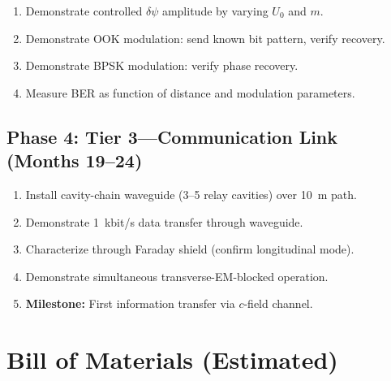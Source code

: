\documentclass[11pt,letterpaper]{article}
\newcommand{\psifield}{\psi}
\begin{document}
\begin{enumerate}
\item Demonstrate controlled $\delta\psifield$ amplitude by
varying $U_0$ and $m$.
\item Demonstrate OOK modulation: send known bit pattern, verify
recovery.
\item Demonstrate BPSK modulation: verify phase recovery.
\item Measure BER as function of distance and modulation
parameters.
\end{enumerate}

\subsection{Phase 4: Tier 3---Communication Link (Months 19--24)}

\begin{enumerate}
\item Install cavity-chain waveguide (3--5 relay cavities) over
10~m path.
\item Demonstrate 1~kbit/s data transfer through waveguide.
\item Characterize through Faraday shield (confirm longitudinal
mode).
\item Demonstrate simultaneous transverse-EM-blocked operation.
\item \textbf{Milestone:} First information transfer via $c$-field
channel.
\end{enumerate}

\section{Bill of Materials (Estimated)}
\label{sec:BOM}
\end{document}
